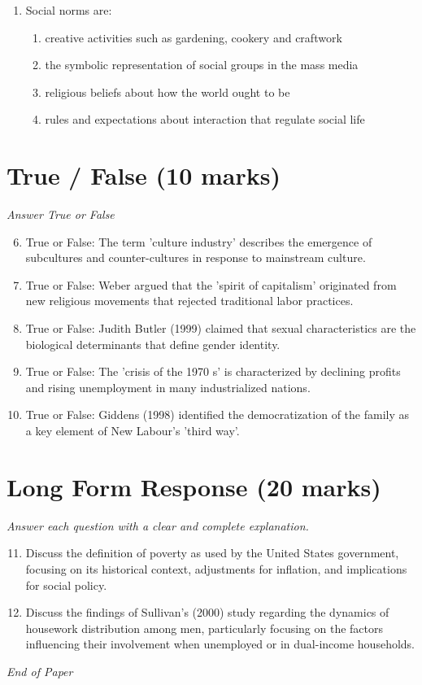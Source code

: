 \documentclass[12pt]{article}
\begin{document}
\begin{enumerate}[label=\arabic*.]
\begin{enumerate}[label=(\alph*)]
    \item a fairground ride
    \item a circus
    \item a puppet theatre
    \item a ballet
\end{enumerate}
\item Social norms are:
\begin{enumerate}[label=(\alph*)]
    \item creative activities such as gardening, cookery and craftwork
    \item the symbolic representation of social groups in the mass media
    \item religious beliefs about how the world ought to be
    \item rules and expectations about interaction that regulate social life
\end{enumerate}
\end{enumerate}

\section*{True / False (10 marks)}
\textit{Answer True or False}
\begin{enumerate}[label=\arabic*.]
\setcounter{enumi}{5}
\item True or False: The term 'culture industry' describes the emergence of subcultures and counter-cultures in response to mainstream culture.
\item True or False: Weber argued that the 'spirit of capitalism' originated from new religious movements that rejected traditional labor practices.
\item True or False: Judith Butler (1999) claimed that sexual characteristics are the biological determinants that define gender identity.
\item True or False: The 'crisis of the 1970 s' is characterized by declining profits and rising unemployment in many industrialized nations.
\item True or False: Giddens (1998) identified the democratization of the family as a key element of New Labour's 'third way'.
\end{enumerate}

\section*{Long Form Response (20 marks)}
\textit{Answer each question with a clear and complete explanation.}
\begin{enumerate}[label=\arabic*.]
\setcounter{enumi}{10}
\item Discuss the definition of poverty as used by the United States government, focusing on its historical context, adjustments for inflation, and implications for social policy.
\item Discuss the findings of Sullivan's (2000) study regarding the dynamics of housework distribution among men, particularly focusing on the factors influencing their involvement when unemployed or in dual-income households.
\end{enumerate}

\vfill
\noindent\textit{End of Paper}
\end{document}
